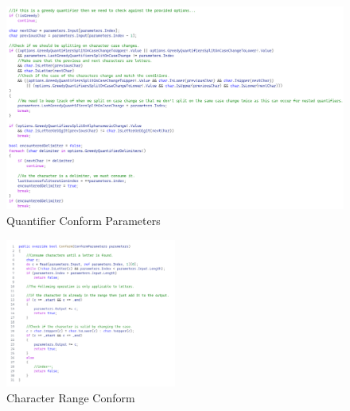 \begin{figure}[H]
    \centering
    \caption{Quantifier Conform Parameters}
    \label{fig:QuantifierConformParameters}
    \includegraphics[width=1.0\textwidth]{Figures/QuantifierConformParameters.png}
\end{figure}

\begin{figure}
    \centering
    \caption{Character Range Conform}
    \label{fig:CharacterRangeConform}
    \includegraphics[width=0.5\textwidth]{Figures/CharacterRangeConform.png}
\end{figure}

